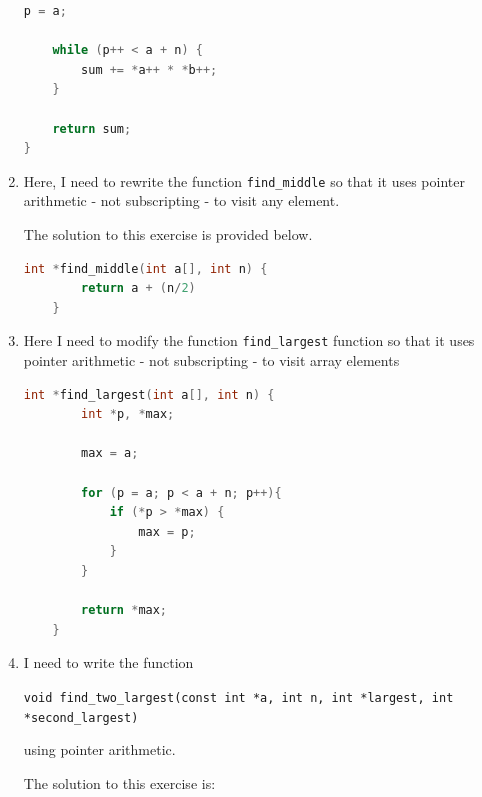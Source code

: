 \documentclass[12pt]{article}
\begin{document}
\begin{enumerate}[1.]
\begin{mdframed}
\begin{lstlisting}[language=c]
    p = a;

    while (p++ < a + n) {
        sum += *a++ * *b++;
    }

    return sum;
}
\end{lstlisting}

    \end{mdframed}

    \item

    Here, I need to rewrite the function \texttt{find\_middle} so that it uses
    pointer arithmetic - not subscripting - to visit any element.

    \bigskip

    The solution to this exercise is provided below.

    \bigskip

\begin{lstlisting}[language=c]
    int *find_middle(int a[], int n) {
        return a + (n/2)
    }
\end{lstlisting}

    \item

    Here I need to modify the function \texttt{find\_largest} function so that it
    uses pointer arithmetic - not subscripting - to visit array elements

    \bigskip

\begin{lstlisting}[language=c]
    int *find_largest(int a[], int n) {
        int *p, *max;

        max = a;

        for (p = a; p < a + n; p++){
            if (*p > *max) {
                max = p;
            }
        }

        return *max;
    }
\end{lstlisting}

    \item

    I need to write the function

    \bigskip

    \texttt{void find\_two\_largest(const int *a, int n, int *largest, int *second\_largest)}

    \bigskip

    using pointer arithmetic.

    \bigskip

    The solution to this exercise is:

    \bigskip



\end{enumerate}
\end{document}
